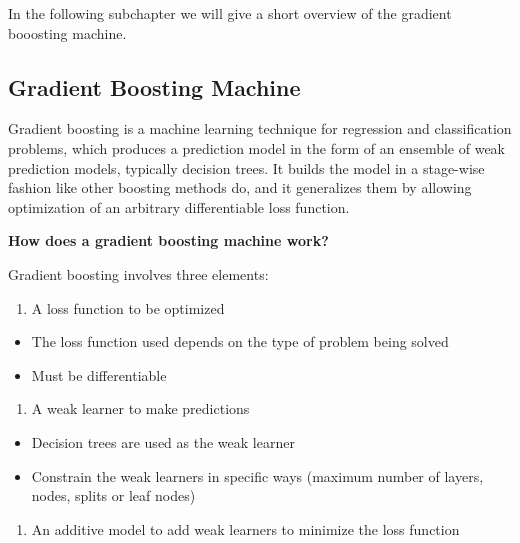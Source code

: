 \documentclass[
]{krantz}
\providecommand{\tightlist}{%
  \setlength{\itemsep}{0pt}\setlength{\parskip}{0pt}}
\begin{document}
In the following subchapter we will give a short overview of the gradient booosting machine.

\hypertarget{gradient-boosting-machine}{%
\subsection{Gradient Boosting Machine}\label{gradient-boosting-machine}}

Gradient boosting is a machine learning technique for regression and classification problems, which produces a prediction model in the form of an ensemble of weak prediction models, typically decision trees. It builds the model in a stage-wise fashion like other boosting methods do, and it generalizes them by allowing optimization of an arbitrary differentiable loss function.

\textbf{How does a gradient boosting machine work?}

Gradient boosting involves three elements:

\begin{enumerate}
\def\labelenumi{\arabic{enumi}.}
\tightlist
\item
  A loss function to be optimized
\end{enumerate}

\begin{itemize}
\tightlist
\item
  The loss function used depends on the type of problem being solved
\item
  Must be differentiable
\end{itemize}

\begin{enumerate}
\def\labelenumi{\arabic{enumi}.}
\setcounter{enumi}{1}
\tightlist
\item
  A weak learner to make predictions
\end{enumerate}

\begin{itemize}
\tightlist
\item
  Decision trees are used as the weak learner
\item
  Constrain the weak learners in specific ways (maximum number of layers, nodes, splits or leaf nodes)
\end{itemize}

\begin{enumerate}
\def\labelenumi{\arabic{enumi}.}
\setcounter{enumi}{2}
\tightlist
\item
  An additive model to add weak learners to minimize the loss function
\end{enumerate}
\end{document}
